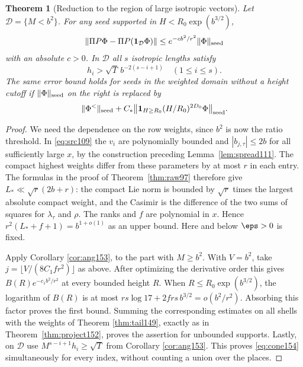 \documentclass[a4paper,11pt]{article}
\newtheorem{theorem}[proposition]{Theorem}
\theoremstyle{definition}
\theoremstyle{remark}
\numberwithin{equation}{section}
\begin{document}
\begin{theorem}[Reduction to the region of large isotropic vectors]
\label{thm:cone154}
Let \(\mathcal D=\{M<b^2\}\). For any seed supported in
\(H<R_0\exp(b^{3/2})\),
\[
  \|\Pi P\Phi-\Pi P(\mathbf1_{\mathcal D}\Phi)\|
               \le e^{-c b^2/r^2}\|\Phi\|_{\rm seed}
\]
with an absolute \(c>0\). In \(\mathcal D\) all \(s\)
isotropic lengths satisfy
\begin{equation}
        h_i>\sqrt T\, b^{-2(s-i+1)}
                 \quad(1\le i\le s).
        \label{eq:cone154}
\end{equation}
The same error bound holds for seeds in the weighted domain
without a height cutoff if \(\|\Phi\|_{\rm seed}\) on the right
is replaced by
\[
 \|\Phi^{<}\|_{\rm seed}
  +C_*\big\|\mathbf1_{H\ge R_0}(H/R_0)^{2D_0}\Phi\big\|_{\rm seed}.
\]
\end{theorem}
\begin{proof}
We need the dependence on the row weights, since \(b^2\) is
now the ratio threshold. In \eqref{eq:src109} the \(v_i\)
are polynomially bounded and \(|b_{j,\tau}|\le2b\) for all
sufficiently large \(x\), by the construction preceding
Lemma~\ref{lem:spread111}. The compact highest weights differ
from these parameters by at most \(r\) in each entry.
The formulas in the proof of Theorem~\ref{thm:raw97} therefore
give \(L_*\ll\sqrt r(2b+r)\): the compact Lie norm is bounded
by \(\sqrt r\) times the largest absolute compact weight, and
the Casimir is the difference of the two sums of squares for
\(\lambda_\tau\) and \(\rho\). The ranks and \(f\) are
polynomial in \(x\). Hence \(r^2(L_*+f+1)=b^{1+o(1)}\) as
an upper bound. Here and below \(\eps>0\) is fixed.

Apply Corollary \ref{cor:ang153}, to the part with \(M\ge b^2\).
With \(V=b^2\), take \(j=\lfloor V/(8C_1fr^2)\rfloor\)
as above. After optimizing the derivative order this gives
\(B(R)e^{-c_1 b^2/r^2}\) at every bounded height \(R\).
When \(R\le R_0\exp(b^{3/2})\), the logarithm of \(B(R)\)
is at most \(rs\log17+2frs\,b^{3/2}=o(b^2/r^2)\).
Absorbing this factor proves the first bound. Summing the
corresponding estimates on all shells with the weights of
Theorem \ref{thm:tail149}, exactly as in
Theorem~\ref{thm:project152}, proves the assertion for
unbounded supports. Lastly, on \(\mathcal D\) use
\(M^{s-i+1}h_i\ge\sqrt T\) from Corollary \ref{cor:ang153}.
This proves \eqref{eq:cone154} simultaneously for every
index, without counting a union over the places.
\end{proof}
\end{document}

